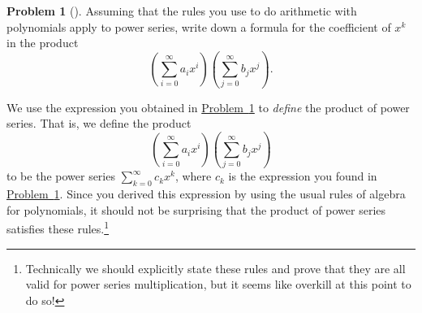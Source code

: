 \documentclass[10pt,]{book}
\theoremstyle{plain}
\theoremstyle{definition}
\newtheorem{activity}[project]{Problem}
\theoremstyle{definition}
\numberwithin{equation}{chapter}
\begin{document}
\begin{activity}[] \label{coeffinpowerseries}
Assuming that the rules you use to do arithmetic with polynomials apply to power series, write down a formula for the coefficient of \(x^k\) in the product%
\begin{equation*}
\left(\sum_{i=0}^\infty a_ix^i\right)\left(\sum_{j=0}^\infty
b_jx^j\right)\text{.}
\end{equation*}
%
\end{activity}
We use the expression you obtained in \hyperref[coeffinpowerseries]{Problem~\ref{coeffinpowerseries}} to \emph{define} the product of power series. That is, we define the product%
\begin{equation*}
\left(\sum_{i=0}^\infty a_ix^i\right)\left(\sum_{j=0}^\infty
b_jx^j\right)
\end{equation*}
to be the power series \(\sum_{k=0}^\infty c_k x^k\), where \(c_k\) is the expression you found in \hyperref[coeffinpowerseries]{Problem~\ref{coeffinpowerseries}}. Since you derived this expression by using the usual rules of algebra for polynomials, it should not be surprising that the product of power series satisfies these rules.\footnote{Technically we should explicitly state these rules and prove that they are all valid for power series multiplication, but it seems like overkill at this point to do so!\label{fn-12}}%
\typeout{************************************************}
\typeout{************************************************}
\end{document}
